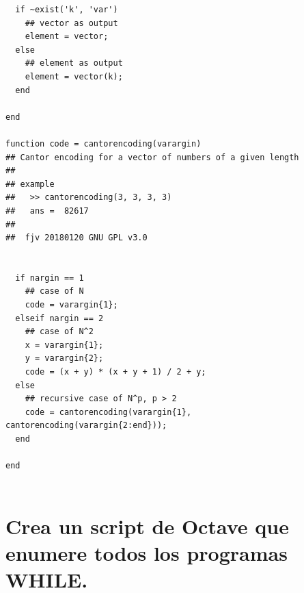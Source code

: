 \documentclass[fleqn, 10pt]{article}
\theoremstyle{plain}
\theoremstyle{definition}
\begin{document}
\begin{verbatim}
  if ~exist('k', 'var')
    ## vector as output
    element = vector;
  else
    ## element as output
    element = vector(k);
  end
  
end
  
function code = cantorencoding(varargin)
## Cantor encoding for a vector of numbers of a given length
##
## example
##   >> cantorencoding(3, 3, 3, 3)
##   ans =  82617
##   
##  fjv 20180120 GNU GPL v3.0


  if nargin == 1
    ## case of N
    code = varargin{1};
  elseif nargin == 2
    ## case of N^2
    x = varargin{1};
    y = varargin{2};
    code = (x + y) * (x + y + 1) / 2 + y;
  else
    ## recursive case of N^p, p > 2
    code = cantorencoding(varargin{1}, cantorencoding(varargin{2:end}));
  end
  
end


\end{verbatim}





\section {Crea un script de Octave que enumere todos los programas WHILE.}
\end{document}
